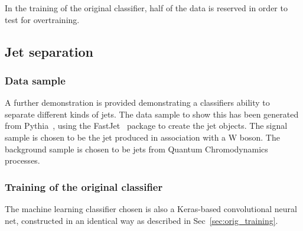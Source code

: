 \documentclass[final,5p,times,twocolumn]{elsarticle}
\begin{document}
In the training of the original classifier, half of the data is
reserved in order to test for overtraining.


\subsection{Jet separation}
\label{sec:hepGPD}

\subsubsection{Data sample}

A further demonstration is provided demonstrating a classifiers ability to separate different
kinds of jets. The data sample to show this has been generated from Pythia~\cite{Sjostrand:2007gs}, using the FastJet~\cite{Cacciari:2011ma} package
to create the jet objects.
The signal sample is chosen to be the jet produced in association with a W boson.
The background sample is chosen to be jets from Quantum Chromodynamics processes.

\subsubsection{Training of the original classifier}

The machine learning classifier chosen is also a Keras-based convolutional neural net,
constructed in an identical way as described in Sec~\ref{sec:orig_training}.
\end{document}
